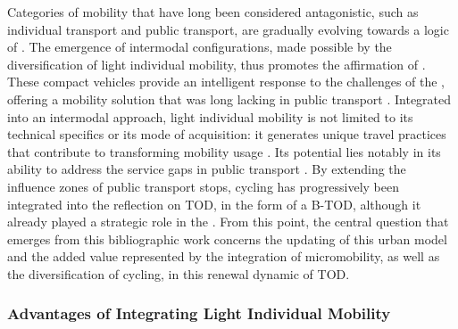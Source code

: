 \begin{refsegment}
Categories of mobility that have long been considered antagonistic, such as individual transport and public transport, are gradually evolving towards a logic of . The emergence of intermodal configurations, made possible by the diversification of light individual mobility, thus promotes the affirmation of  \textcolor{blue}{\autocites[14-15]{amar_homo_2016}[18]{fijalkow_sociologie_2017}[5]{kostrzewska_towards_2017}}. These compact vehicles provide an intelligent response to the challenges of the , offering a  mobility solution that was long lacking in public transport \textcolor{blue}{\autocite{dia_banning_2019}}. Integrated into an intermodal approach, light individual mobility is not limited to its technical specifics or its mode of acquisition: it generates unique travel practices that contribute to transforming mobility usage \textcolor{blue}{\autocite[1]{tuncer_notes_2020}}. Its potential lies notably in its ability to address the service gaps in public transport \textcolor{blue}{\autocites{gauquelin_case_2021}[3]{lee_forecasting_2021}}. By extending the influence zones of public transport stops, cycling has progressively been integrated into the reflection on \acrshort{TOD}, in the form of a \acrfull{B-TOD}, although it already played a strategic role in the . From this point, the central question that emerges from this bibliographic work concerns the updating of this urban model and the added value represented by the integration of micromobility, as well as the diversification of cycling, in this renewal dynamic of \acrshort{TOD}.%

\subsubsection*{Advantages of Integrating Light Individual Mobility
    \label{chap1:avantages-mil-tc}
    }


\end{refsegment}

